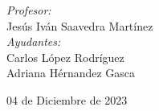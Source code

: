 \begin{titlepage}
\begin{minipage}{0.7\textwidth}
    \begin{flushleft} \large
        \emph{Profesor:}\\
            Jesús Iván Saavedra Martínez \\
            \vspace{3mm}
            \emph{Ayudantes:}\\
            Carlos López Rodríguez\\
            \vspace{2mm}
            Adriana Hérnandez Gasca
    \end{flushleft}
\end{minipage}

\vspace{15mm}

{\large 04 de Diciembre de 2023}\\[2cm]
\vfill 
\end{titlepage}